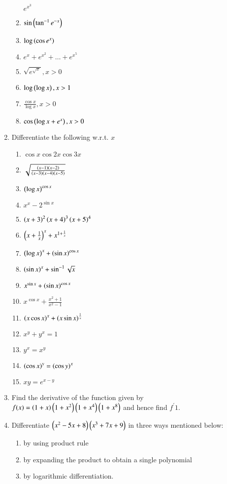 \begin{enumerate}[label=\arabic*.,ref=\thesubsection.\theenumi]
\begin{enumerate}
$
e^{x^3}
$
\item 
$
\sin \left(\tan ^{-1}e^{-x}\right)
$
\item 
$
\log\left(\cos e^x\right)
$
\item 
$
e^x + e^{x^2}+\dots+e^{x^5}
$
\item 
$
\sqrt{e^{\sqrt{x}}}, x > 0
$
\item 
$
\log\left(\log x\right), x > 1
$
\item 
$
\frac{\cos x}{\log x}, x > 0
$
\item 
$
\cos \left(\log x + e^x\right), x > 0
$
\end{enumerate}
\item Differentiate the following w.r.t. $x$
\begin{enumerate}
\item 
$
\cos x \cos 2x \cos 3x
$
\item 
$
\sqrt{\frac{\left(x-1\right)\left(x-2\right)}{\left(x-3\right)\left(x-4\right)\left(x-5\right)}}
$
\item 
$
\left(\log x\right)^{\cos x}
$
\item 
$
x^x - 2^{\sin x}
$
\item 
$
\left(x+3\right)^2\left(x+4\right)^3\left(x+5\right)^4
$
\item 
$
\left(x + \frac{1}{x}\right)^x+x^{1+\frac{1}{x}}
$
\item 
$
\left(\log x\right)^x + \left(\sin x\right)^{\cos x}
$
\item 
$
\left(\sin x\right)^x +\sin^{-1}\sqrt{x}
$
\item 
$
x^{\sin x} + \left(\sin x\right)^{\cos x}
$
\item 
$
x^{\cos x} + \frac{x^2+1}{x^2-1}
$
\item 
$
\left(x \cos x\right)^x + \left(x \sin x\right)^{\frac{1}{x}}
$
\item 
$
x^{y}+y^x = 1
$
\item 
$
y^x = x^y
$
\item 
$
\left(\cos x\right)^y = \left(\cos y\right)^{x}
$
\item
$
xy = e^{x-y}
$
\end{enumerate}
\item Find the derivative of the function given by 
$
f(x) = \left(1+x\right)\left(1+x^2\right)\left(1+x^4\right)\left(1+x^8\right)
$
and hence find $f^{\prime} 1$.
\item Differentiate 
$
\left(x^2-5x+8\right)\left(x^3+7x+9\right)
$
in three ways mentioned below:
\begin{enumerate}
\item by using product rule
\item by expanding the product to obtain a single polynomial
\item by logarithmic differentiation.

\end{enumerate}
\end{enumerate}
